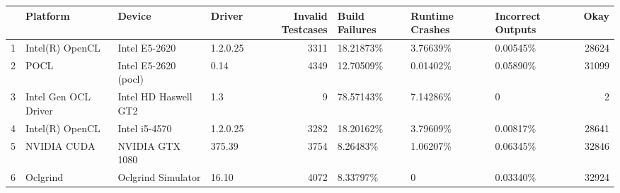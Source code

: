 \begin{tabular}{llllrlllr}
\toprule
{} &              Platform &                Device &    Driver &  Invalid Testcases & Build Failures & Runtime Crashes & Incorrect Outputs &   Okay \\
\midrule
1 &       Intel(R) OpenCL &         Intel E5-2620 &  1.2.0.25 &               3311 &      18.21873\% &        3.76639\% &          0.00545\% &  28624 \\
2 &                  POCL &  Intel E5-2620 (pocl) &      0.14 &               4349 &      12.70509\% &        0.01402\% &          0.05890\% &  31099 \\
3 &  Intel Gen OCL Driver &  Intel HD Haswell GT2 &       1.3 &                  9 &      78.57143\% &        7.14286\% &                 0 &      2 \\
4 &       Intel(R) OpenCL &         Intel i5-4570 &  1.2.0.25 &               3282 &      18.20162\% &        3.79609\% &          0.00817\% &  28641 \\
5 &           NVIDIA CUDA &       NVIDIA GTX 1080 &    375.39 &               3754 &       8.26483\% &        1.06207\% &          0.06345\% &  32846 \\
6 &              Oclgrind &    Oclgrind Simulator &     16.10 &               4072 &       8.33797\% &               0 &          0.03340\% &  32924 \\
\bottomrule
\end{tabular}
